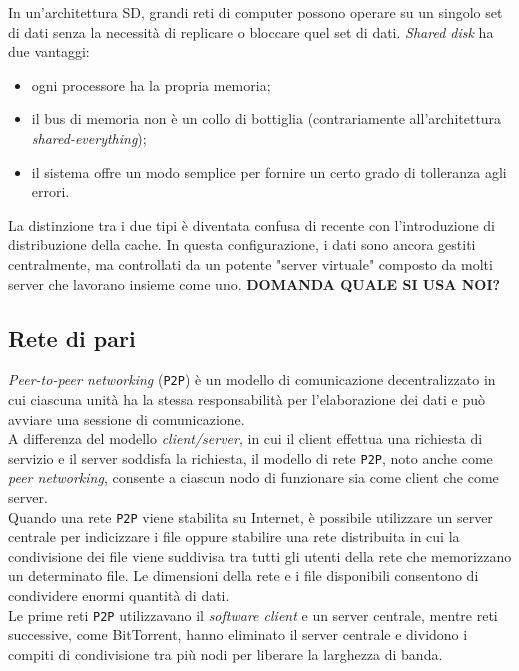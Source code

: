 In un'architettura SD, grandi reti di computer possono operare su un singolo set di dati senza la necessit\`{a} di replicare o bloccare quel set di dati.\cite{etichetta7}
\textit{Shared disk} ha due vantaggi:
\begin{itemize}
\item
ogni processore ha la propria memoria; 
\item
il bus di memoria non \`{e} un collo di bottiglia (contrariamente all'architettura \textit{shared-everything}); 
\item 
il sistema offre un modo semplice per fornire un certo grado di tolleranza agli errori.
\end{itemize}
La distinzione tra i due tipi \`{e} diventata confusa di recente con l'introduzione di distribuzione della cache. In questa configurazione, i dati sono ancora gestiti centralmente, ma controllati da un potente "server virtuale" composto da molti server che lavorano insieme come uno.\cite{etichetta2}
\textbf{DOMANDA QUALE SI USA NOI?}
\item
\subsection{Rete di pari}
\textit{Peer-to-peer networking} (\verb"P2P") \`{e} un modello di comunicazione decentralizzato in cui ciascuna unit\`{a} ha la stessa responsabilit\`{a} per l'elaborazione dei dati e pu\`{o} avviare una sessione di comunicazione. \\
A differenza del modello\textit{ client/server}, in cui il client effettua una richiesta di servizio e il server soddisfa la richiesta, il modello di rete \verb"P2P", noto anche come \textit{peer networking}, consente a ciascun nodo di funzionare sia come client che come server.\cite{etichetta13}\\
Quando una rete \verb"P2P" viene stabilita su Internet, \`{e} possibile utilizzare un server centrale per indicizzare i file oppure stabilire una rete distribuita in cui la condivisione dei file viene suddivisa tra tutti gli utenti della rete che memorizzano un determinato file. Le dimensioni della rete e i file disponibili consentono di condividere enormi quantit\`{a} di dati.\\ 
Le prime reti \verb"P2P" utilizzavano il \textit{software client} e un server centrale, mentre reti successive, come BitTorrent, hanno eliminato il server centrale e dividono i compiti di condivisione tra pi\`{u} nodi per liberare la larghezza di banda.\\


